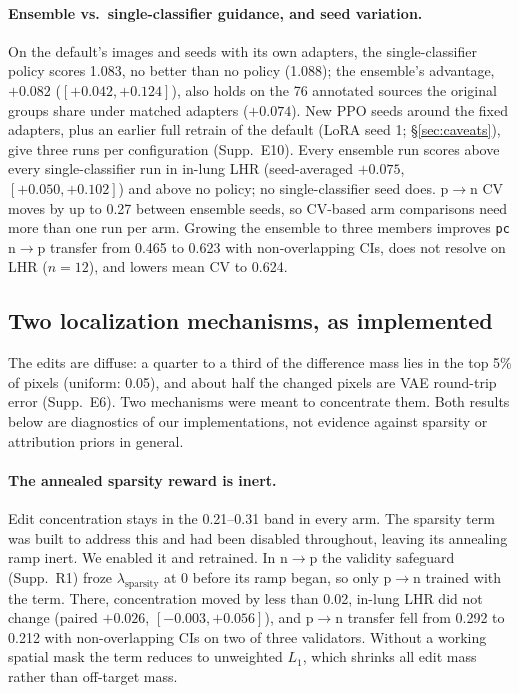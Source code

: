 \paragraph{Ensemble vs.\ single-classifier guidance, and seed variation.} On the default's images and seeds with its own adapters, the single-classifier policy scores 1.083, no better than no policy (1.088); the ensemble's advantage, $+0.082$ ($[+0.042, +0.124]$), also holds on the 76 annotated sources the original groups share under matched adapters ($+0.074$). New PPO seeds around the fixed adapters, plus an earlier full retrain of the default (LoRA seed 1; \S\ref{sec:caveats}), give three runs per configuration (Supp.~E10). Every ensemble run scores above every single-classifier run in in-lung LHR (seed-averaged $+0.075$, $[+0.050, +0.102]$) and above no policy; no single-classifier seed does. p$\to$n CV moves by up to 0.27 between ensemble seeds, so CV-based arm comparisons need more than one run per arm. Growing the ensemble to three members improves \texttt{pc} n$\to$p transfer from 0.465 to 0.623 with non-overlapping CIs, does not resolve on LHR ($n=12$), and lowers mean CV to 0.624.

\subsection{Two localization mechanisms, as implemented}
\label{sec:negative-results}

The edits are diffuse: a quarter to a third of the difference mass lies in the top 5\% of pixels (uniform: 0.05), and about half the changed pixels are VAE round-trip error (Supp.~E6). Two mechanisms were meant to concentrate them. Both results below are diagnostics of our implementations, not evidence against sparsity or attribution priors in general.

\paragraph{The annealed sparsity reward is inert.} Edit concentration stays in the 0.21--0.31 band in every arm. The sparsity term was built to address this and had been disabled throughout, leaving its annealing ramp inert. We enabled it and retrained. In n$\to$p the validity safeguard (Supp.~R1) froze $\lambda_{\text{sparsity}}$ at 0 before its ramp began, so only p$\to$n trained with the term. There, concentration moved by less than 0.02, in-lung LHR did not change (paired $+0.026$, $[-0.003, +0.056]$), and p$\to$n transfer fell from 0.292 to 0.212 with non-overlapping CIs on two of three validators. Without a working spatial mask the term reduces to unweighted $L_1$, which shrinks all edit mass rather than off-target mass.

